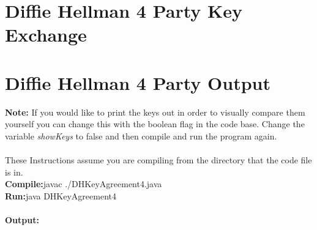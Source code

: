 \documentclass[a4paper, twoside, 11pt]{article}
\begin{document}
\section{Diffie Hellman 4 Party Key Exchange}

\newpage
\section{Diffie Hellman 4 Party Output}
\textbf{Note:} If you would like to print the keys out in order to visually compare them yourself you can change this with the boolean flag in the code base. Change the variable \textit{showKeys} to false and then compile and run the program again. \\
\\
These Instructions assume you are compiling from the directory that the code file is in.\\
\textbf{Compile:}javac ./DHKeyAgreement4.java \\
\textbf{Run:}java DHKeyAgreement4
\\
\\
\textbf{Output:}

\end{document}
